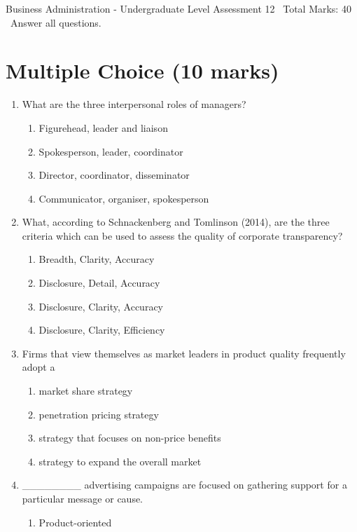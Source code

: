 \documentclass[12pt]{article}
\begin{document}
\begin{center}
Business Administration - Undergraduate Level Assessment 12 \
Total Marks: 40 \
Answer all questions.
\end{center}

\section*{Multiple Choice (10 marks)}
\begin{enumerate}[label=\arabic*.]
\item What are the three interpersonal roles of managers?
\begin{enumerate}[label=(\alph*)]
    \item Figurehead, leader and liaison
    \item Spokesperson, leader, coordinator
    \item Director, coordinator, disseminator
    \item Communicator, organiser, spokesperson
\end{enumerate}
\item What, according to Schnackenberg and Tomlinson (2014), are the three criteria which can be used to assess the quality of corporate transparency?
\begin{enumerate}[label=(\alph*)]
    \item Breadth, Clarity, Accuracy
    \item Disclosure, Detail, Accuracy
    \item Disclosure, Clarity, Accuracy
    \item Disclosure, Clarity, Efficiency
\end{enumerate}
\item Firms that view themselves as market leaders in product quality frequently adopt a
\begin{enumerate}[label=(\alph*)]
    \item market share strategy
    \item penetration pricing strategy
    \item strategy that focuses on non-price benefits
    \item strategy to expand the overall market
\end{enumerate}
\item \_\_\_\_\_\_\_\_ advertising campaigns are focused on gathering support for a particular message or cause.
\begin{enumerate}[label=(\alph*)]
    \item Product-oriented

\end{enumerate}
\end{enumerate}
\end{document}
